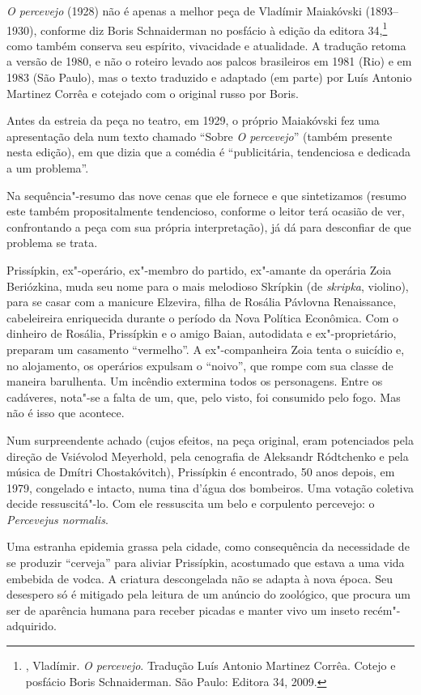 {\emph{O percevejo} (1928) não é apenas a melhor peça de Vladímir
Maiakóvski (1893--1930), conforme diz Boris Schnaiderman no posfácio à
edição da editora 34,\footnote{, Vladímir. \emph{O percevejo}.
  Tradução Luís Antonio Martinez Corrêa. Cotejo e posfácio Boris
  Schnaiderman. São Paulo: Editora 34, 2009.} como também conserva seu
espírito, vivacidade e atualidade. A tradução retoma a versão de 1980, e
não o roteiro levado aos palcos brasileiros em 1981 (Rio) e em 1983 (São
Paulo), mas o texto traduzido e adaptado (em parte) por Luís Antonio
Martinez Corrêa e cotejado com o original russo por Boris.

Antes da estreia da peça no teatro, em 1929, o próprio Maiakóvski fez
uma apresentação dela num texto chamado ``Sobre \emph{O percevejo}''
(também presente nesta edição), em que dizia que a comédia é
``publicitária, tendenciosa e dedicada a um problema''.

Na sequência"-resumo das nove cenas que ele fornece e que sintetizamos
(resumo este também propositalmente tendencioso, conforme o leitor terá
ocasião de ver, confrontando a peça com sua própria interpretação), já
dá para desconfiar de que problema se trata.

Prissípkin, ex"-operário, ex"-membro do partido, ex"-amante da operária
Zoia Beriózkina, muda seu nome para o mais melodioso Skrípkin (de
\emph{skripka}, violino), para se casar com a manicure Elzevira, filha
de Rosália Pávlovna Renaissance, cabeleireira enriquecida durante o
período da Nova Política Econômica. Com o dinheiro de Rosália,
Prissípkin e o amigo Baian, autodidata e ex"-proprietário, preparam um
casamento ``vermelho''. A ex"-companheira Zoia tenta o suicídio e, no
alojamento, os operários expulsam o ``noivo'', que rompe com sua classe de
maneira barulhenta. Um incêndio extermina todos os personagens. Entre os
cadáveres, nota"-se a falta de um, que, pelo visto, foi consumido pelo
fogo. Mas não é isso que acontece.

Num surpreendente achado (cujos efeitos, na peça original, eram
potenciados pela direção de Vsiévolod Meyerhold, pela cenografia de
Aleksandr Ródtchenko e pela música de Dmítri Chostakóvitch), Prissípkin
é encontrado, 50 anos depois, em 1979, congelado e intacto, numa tina
d'água dos bombeiros. Uma votação coletiva decide ressuscitá"-lo. Com ele
ressuscita um belo e corpulento percevejo: o \emph{Percevejus normalis}.

Uma estranha epidemia grassa pela cidade, como consequência da
necessidade de se produzir ``cerveja'' para aliviar Prissípkin, acostumado
que estava a uma vida embebida de vodca. A criatura descongelada não se
adapta à nova época. Seu desespero só é mitigado pela leitura de um
anúncio do zoológico, que procura um ser de aparência humana para
receber picadas e manter vivo um inseto recém"-adquirido.

}
